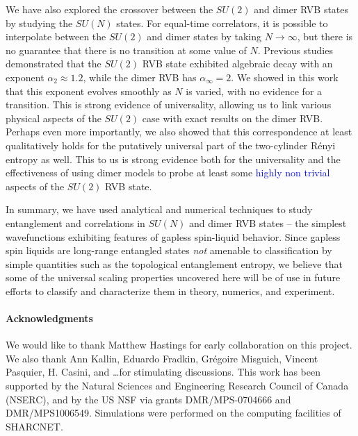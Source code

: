 \documentclass[11pt]{iopart}
\begin{document}
We have also explored the crossover between the $SU(2)$ and dimer RVB states by studying the $SU(N)$ states. For equal-time correlators, it is possible to interpolate between the $SU(2)$ and dimer states by taking $N \rightarrow \infty$, but there is no guarantee that there is no transition at some value of $N$.  Previous studies demonstrated that the $SU(2)$ RVB state exhibited algebraic decay with an exponent $\alpha_2 \approx 1.2$, while the dimer RVB has $\alpha_{\infty} = 2$.  We showed in this work that this exponent evolves smoothly as $N$ is varied, with no evidence for a transition.  
This is strong evidence of universality, allowing us to link various physical aspects of the $SU(2)$ case with exact results on the dimer RVB. Perhaps even more importantly, we also showed that this correspondence at least qualitatively holds for the putatively universal part of the two-cylinder Rényi entropy as well. This to us is strong evidence both for the universality and the effectiveness of using dimer models to probe at least some \textcolor{blue}{highly non trivial} aspects of the $SU(2)$ RVB state.



In summary, we have used analytical and numerical techniques to study entanglement and correlations in $SU(N)$ and dimer RVB states --  the simplest wavefunctions exhibiting features of gapless spin-liquid behavior. Since gapless spin liquids are long-range entangled states {\it not} amenable to  classification by simple quantities such as the topological entanglement entropy, we believe that some of the universal scaling properties uncovered here will be of use in future efforts to classify and characterize them in theory, numerics, and experiment.





\paragraph{Acknowledgments}
 We would like to thank Matthew Hastings for early collaboration on this project. We also thank Ann Kallin, Eduardo Fradkin, Gr\'egoire Misguich, Vincent Pasquier, H. Casini, and \ldots for stimulating discussions. This work has been supported by the Natural Sciences and Engineering
Research Council of Canada (NSERC), and by the US NSF via grants DMR/MPS-0704666 and DMR/MPS1006549.   Simulations were performed on the computing facilities of SHARCNET.
\end{document}
